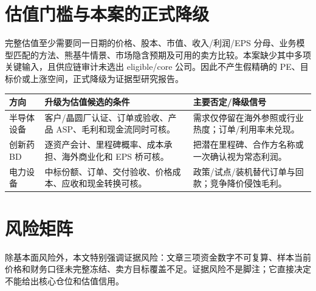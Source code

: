 \section{估值门槛与本案的正式降级}
完整估值至少需要同一日期的价格、股本、市值、收入/利润/EPS 分母、业务模型匹配的方法、熊基牛情景、市场隐含预期及可用的卖方比较。本案缺少其中多项关键输入，且供应链审计未选出 eligible/core 公司。因此不产生假精确的 PE、目标价或上涨空间，正式降级为证据型研究报告。

\begin{exhibitbox}[升级与否定条件]
\small
\begin{tabularx}{\exhibitboxwidth}{L{2.1cm}X X}
\toprule 方向 & 升级为估值候选的条件 & 主要否定/降级信号\\ \midrule
半导体设备 & 客户/晶圆厂认证、订单或验收、产品 ASP、毛利和现金流同时可核。 & 需求仅停留在海外参照或行业热度；订单/利用率未兑现。\\
创新药 BD & 逐资产会计、里程碑概率、成本承担、海外商业化和 EPS 桥可核。 & 把潜在里程碑、合作方名称或一次确认视为常态利润。\\
电力设备 & 中标份额、订单、交付验收、价格成本、应收和现金转换可核。 & 政策/试点/装机替代订单与回款；竞争降价侵蚀毛利。\\
\bottomrule
\end{tabularx}
\end{exhibitbox}

\section{风险矩阵}
除基本面风险外，本文特别强调证据风险：文章三项资金数字不可复算、样本当前价格和财务口径未完整冻结、卖方目标覆盖不足。证据风险不是脚注；它直接决定不能给出核心仓位和估值信用。
